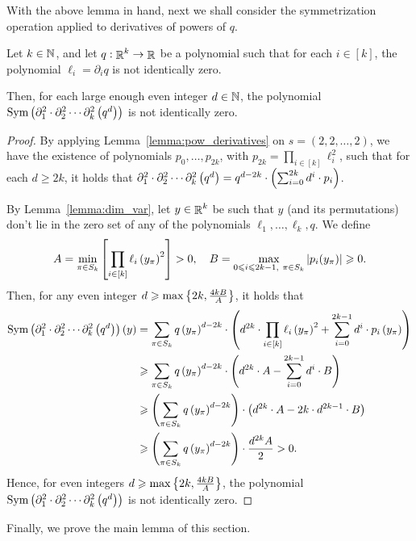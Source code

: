 With the above lemma in hand, next we shall consider the symmetrization operation applied to derivatives of powers of $q$.

\begin{lemma}\label{lemma:pow_sec_der}
	Let $k\in \mathbb{N}$, and let $q:\mathop{\mathbb{R}}^k\to \mathop{\mathbb{R}}$ be a polynomial such that for each $i\in [k]$, the polynomial $\ell_i=\partial_iq$ is not identically zero.
	
	Then, for each large enough even integer $d\in \mathbb{N}$, the polynomial $\textnormal{Sym}\left( \partial_1^2\cdot\partial_2^2\cdots \partial_k^2\left( q^d \right) \right)$ is not identically zero.
\end{lemma}
\begin{proof}
	By applying Lemma~\ref{lemma:pow_derivatives} on $s = (2,2,\dots,2)$, we have the existence of polynomials $p_0, \dots, p_{2k}$, with $p_{2k} = \prod_{i\in [k]}\ell_i^2$, such that for each $d\geq 2k$, it holds that $\partial_1^{2}\cdot\partial_2^{2}\cdots \partial_k^{2}\left( q^d \right) = q^{d-2k}\cdot \left( \sum_{i=0}^{2k} d^i\cdot p_i \right)$.
	
	By Lemma~\ref{lemma:dim_var}, let $y\in \mathop{\mathbb{R}}^k$ be such that $y$ (and its permutations) don't lie in the zero set of any of the polynomials $\ell_1,\dots,\ell_k, q$.
	We define \[ A = \min_{\pi\in S_k}\left[ \prod_{i\in [k]}\ell_i\left( y_\pi \right)^2 \right] > 0, \quad B = \max_{0\leqslant i\leqslant 2k-1,\ \pi\in S_k}\left|p_i(y_\pi)\right|\geqslant 0. \]
	Then, for any even integer $d\geqslant \max\left\{ 2k, \frac{4kB}{A} \right\}$, it holds that
	\begin{align*}
		\textnormal{Sym}\left( \partial_1^{2}\cdot\partial_2^{2}\cdots \partial_k^{2}\left( q^d \right) \right)(y) 
		&=\sum_{\pi\in S_k} q\left( y_\pi \right)^{d-2k}\cdot \left( d^{2k}\cdot \prod_{i\in [k]}\ell_i\left( y_{\pi} \right)^2 + \sum_{i=0}^{2k-1} d^i\cdot p_i\left( y_\pi \right) \right)
		\\&\geqslant \sum_{\pi\in S_k} q\left( y_\pi \right)^{d-2k}\cdot \left( d^{2k}\cdot A - \sum_{i=0}^{2k-1}d^i\cdot B \right)
		\\&\geqslant  \left( \sum_{\pi\in S_k} q\left( y_\pi \right)^{d-2k} \right)\cdot \left( d^{2k}\cdot A - 2k\cdot d^{2k-1}\cdot B \right)
		\\&\geqslant \left( \sum_{\pi\in S_k} q\left( y_\pi \right)^{d-2k} \right)\cdot \frac{d^{2k} A}{2} > 0.
	\end{align*}
	Hence, for even integers $d\geqslant \max\left\{ 2k, \frac{4kB}{A} \right\}$, the polynomial $\textnormal{Sym}\left( \partial_1^{2}\cdot\partial_2^{2}\cdots \partial_k^{2}\left( q^d \right) \right)$ is not identically zero.
\end{proof}

Finally, we prove the main lemma of this section.

